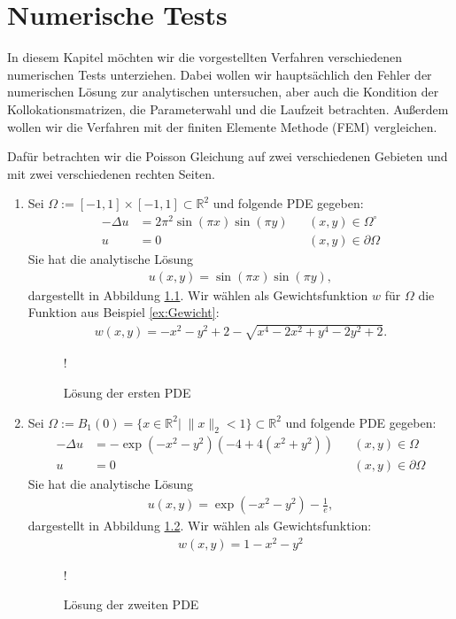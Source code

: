 \chapter{Numerische Tests}
\label{cha:NumerischeTests}

In diesem Kapitel möchten wir die vorgestellten Verfahren verschiedenen numerischen Tests unterziehen. Dabei wollen wir hauptsächlich den Fehler der numerischen Lösung zur analytischen untersuchen, aber auch die Kondition der Kollokationsmatrizen, die Parameterwahl und die Laufzeit betrachten. Außerdem wollen wir die Verfahren mit der finiten Elemente Methode (\acs{FEM}) vergleichen. 

Dafür betrachten wir die Poisson Gleichung auf zwei verschiedenen Gebieten und mit zwei verschiedenen rechten Seiten.
\begin{enumerate}
\item
Sei $\Omega := [-1,1] \times [-1,1] \subset \mathbb{R}^2$ und folgende \ac{PDE} gegeben:
\begin{align*}
- \Delta u &= 2\pi^2 \sin(\pi x)\sin(\pi y)&& (x,y) \in \Omega^\circ\\
u &= 0&& (x,y) \in \partial \Omega
\end{align*}
Sie hat die analytische Lösung 
\begin{align*}
u(x,y) = \sin(\pi x)\sin(\pi y),
\end{align*}
dargestellt in Abbildung \ref{fig:pde1sol}. Wir wählen als Gewichtsfunktion $w$ für $\Omega$ die Funktion aus Beispiel \ref{ex:Gewicht}:
\begin{align*}
w(x,y) = -x^2-y^2+2 - \sqrt{x^4 -2x^2 + y^4 -2y^2+2}.
\end{align*}
\begin{figure}[ht]
\centering
\resizebox {\columnwidth} {!} {

}
\caption{Lösung der ersten \acs{PDE}}
\label{fig:pde1sol}
\end{figure}
\item
Sei $\Omega := B_1(0) = \{x \in \mathbb{R}^2 |\; \|x\|_2 < 1\} \subset \mathbb{R}^2$ und folgende \ac{PDE} gegeben:
\begin{align*}
- \Delta u &= -\exp(-x^2 -y^2)(-4+4(x^2+y^2)) && (x,y)  \in \Omega\\
u &= 0&& (x,y) \in \partial \Omega
\end{align*}
Sie hat die analytische Lösung 
\begin{align*}
u(x,y) = \exp(-x^2-y^2) - \frac{1}{e},
\end{align*}  dargestellt in Abbildung \ref{fig:pde2sol}. Wir wählen als Gewichtsfunktion:
\begin{align*}
w(x,y) = 1 -x^2 -y^2
\end{align*}
\begin{figure}[ht]
\centering
\resizebox {\columnwidth} {!} {

}
\caption{Lösung der zweiten \acs{PDE}}
\label{fig:pde2sol}
\end{figure}
\end{enumerate}


